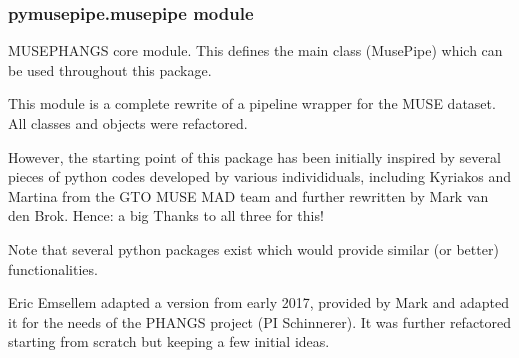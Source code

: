 \documentclass[letterpaper,10pt,english]{sphinxmanual}
\begin{document}
\subsubsection{pymusepipe.musepipe module}
\label{\detokenize{api/pymusepipe:module-pymusepipe.musepipe}}\label{\detokenize{api/pymusepipe:pymusepipe-musepipe-module}}
\sphinxAtStartPar
MUSE\sphinxhyphen{}PHANGS core module.
This defines the main class (MusePipe) which can be used throughout this package.

\sphinxAtStartPar
This module is a complete rewrite of a pipeline wrapper for the MUSE dataset.
All classes and objects were refactored.

\sphinxAtStartPar
However, the starting point of this package has been initially
inspired by several pieces of python codes developed by various individiduals,
including Kyriakos and Martina from the GTO MUSE MAD team and further
rewritten by Mark van den Brok.
Hence: a big Thanks to all three for this!

\sphinxAtStartPar
Note that several python packages exist which would provide similar
(or better) functionalities.

\sphinxAtStartPar
Eric Emsellem adapted a version from early 2017, provided by Mark and adapted
it for the needs of the PHANGS project (PI Schinnerer). It was further
refactored starting from scratch but keeping a few initial ideas.
\end{document}
